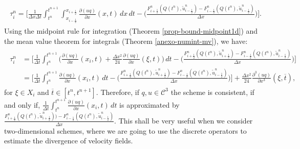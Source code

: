\begin{align*}
	\begin{split}
		\tau_{i}^n = 
		\bigg[ \frac{1}{\Delta x \Delta t}  \int_{t^{n}}^{t^{n+1}} \int_{x_{i-\frac{1}{2}}}^{x_{i+\frac{1}{2}}}
		{\frac{\partial (uq)}{\partial x}}(x, t) \,dx \,dt - 
		\bigg(\frac{{F}^n_{i+\frac{1}{2}}(Q(t^n),\tilde{u}^n_{i-\frac{1}{2}})-{F}^n_{i-\frac{1}{2}}(Q(t^n),\tilde{u}^n_{i-\frac{1}{2}})}{\Delta x} \bigg)
		\bigg].
	\end{split}
\end{align*}
Using the midpoint rule for integration (Theorem \ref{prop-bound-midpoint1d}) and the mean value theorem for integrals
(Theorem \ref{anexo-numint-mv}), 
we have:
\begin{align}
	\begin{split}
		\label{consistency-1d-eq3}
		\tau_{i}^n 
		&= 
		\bigg[ \frac{1}{\Delta t}  \int_{t^{n}}^{t^{n+1}}
		{\bigg(\frac{\partial (uq)}{\partial x}}(x_i, t) + \frac{\Delta x^2}{24}\frac{\partial (uq)}{\partial x}(\xi, t) \bigg) \,dt - 
		\bigg(\frac{{F}^n_{i+\frac{1}{2}}(Q(t^n),\tilde{u}^n_{i+\frac{1}{2}})
			-{F}^n_{i-\frac{1}{2}}(Q(t^n),\tilde{u}^n_{i-\frac{1}{2}})}{\Delta x} \bigg)
		\bigg] \\
		& = 
		\bigg[ \frac{1}{\Delta t}  \int_{t^{n}}^{t^{n+1}}
		{\frac{\partial (uq)}{\partial x}}(x_i, t) \,dt - 
		\bigg(\frac{{F}^n_{i+\frac{1}{2}}(Q(t^n),\tilde{u}^n_{i+\frac{1}{2}}) - {F}^n_{i-\frac{1}{2}}(Q(t^n),\tilde{u}^n_{i-\frac{1}{2}})}{\Delta x} \bigg)
		\bigg] +  \frac{\Delta x^2}{24}\frac{\partial^3 (uq)}{\partial x^3}(\xi, \overline{t}), 
	\end{split}
\end{align}
for $\xi \in X_i$ and $\overline{t} \in [t^{n},t^{n+1}]$. Therefore, if $q,u \in \mathcal{C}^3$ the scheme is
consistent, if and only if, $\frac{1}{\Delta t}  \int_{t^{n}}^{t^{n+1}} {\frac{\partial (uq)}{\partial x}}(x_i, t) \,dt$
is approximated by 
$\frac{{F}^n_{i+\frac{1}{2}}(Q(t^n),\tilde{u}^n_{i+\frac{1}{2}})) -{F}^n_{i-\frac{1}{2}}(Q(t^n),\tilde{u}^n_{i-\frac{1}{2}})}{\Delta x}$.
This shall be very useful when we consider two-dimensional schemes, where we are going to use the discrete operators to estimate the divergence
of velocity fields.

